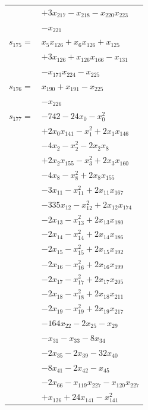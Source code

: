 \begin{longtable}{@{}r@{\;}l@{}}
 & \(\displaystyle +3x_{217} -x_{218} -x_{220}x_{223}\) \\
 & \(\displaystyle -x_{221}\) \\[3pt]
\(s_{175}=\) & \(\displaystyle x_{5}x_{126} +x_{6}x_{126} +x_{125}\) \\
 & \(\displaystyle +3x_{126} +x_{126}x_{166} -x_{131}\) \\
 & \(\displaystyle -x_{173}x_{224} -x_{225}\) \\[3pt]
\(s_{176}=\) & \(\displaystyle x_{190} +x_{191} -x_{225}\) \\
 & \(\displaystyle -x_{226}\) \\[3pt]
\(s_{177}=\) & \(\displaystyle -742 -24x_{0} -x_{0}^{2}\) \\
 & \(\displaystyle +2x_{0}x_{141} -x_{1}^{2} +2x_{1}x_{146}\) \\
 & \(\displaystyle -4x_{2} -x_{2}^{2} -2x_{2}x_{8}\) \\
 & \(\displaystyle +2x_{2}x_{155} -x_{3}^{2} +2x_{3}x_{160}\) \\
 & \(\displaystyle -4x_{8} -x_{8}^{2} +2x_{8}x_{155}\) \\
 & \(\displaystyle -3x_{11} -x_{11}^{2} +2x_{11}x_{167}\) \\
 & \(\displaystyle -335x_{12} -x_{12}^{2} +2x_{12}x_{174}\) \\
 & \(\displaystyle -2x_{13} -x_{13}^{2} +2x_{13}x_{180}\) \\
 & \(\displaystyle -2x_{14} -x_{14}^{2} +2x_{14}x_{186}\) \\
 & \(\displaystyle -2x_{15} -x_{15}^{2} +2x_{15}x_{192}\) \\
 & \(\displaystyle -2x_{16} -x_{16}^{2} +2x_{16}x_{199}\) \\
 & \(\displaystyle -2x_{17} -x_{17}^{2} +2x_{17}x_{205}\) \\
 & \(\displaystyle -2x_{18} -x_{18}^{2} +2x_{18}x_{211}\) \\
 & \(\displaystyle -2x_{19} -x_{19}^{2} +2x_{19}x_{217}\) \\
 & \(\displaystyle -164x_{22} -2x_{25} -x_{29}\) \\
 & \(\displaystyle -x_{31} -x_{33} -8x_{34}\) \\
 & \(\displaystyle -2x_{35} -2x_{39} -32x_{40}\) \\
 & \(\displaystyle -8x_{41} -2x_{42} -x_{45}\) \\
 & \(\displaystyle -2x_{66} -x_{119}x_{227} -x_{120}x_{227}\) \\
 & \(\displaystyle +x_{126} +24x_{141} -x_{141}^{2}\) \\

\end{longtable}
